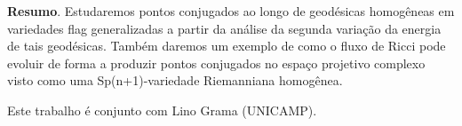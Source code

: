 	\vspace{24pt}

	
	
	\noindent\textbf{Resumo}.\label{rp} 
	Estudaremos pontos conjugados ao longo de geodésicas homogêneas em variedades flag generalizadas a partir da análise da segunda variação da energia de tais geodésicas. Também daremos um exemplo de como o fluxo de Ricci pode evoluir de forma a produzir pontos conjugados no espaço projetivo complexo visto como uma Sp(n+1)-variedade Riemanniana homogênea.
	
	\vspace*{0.5cm} \noindent Este trabalho é conjunto com Lino Grama (UNICAMP).
	\vspace{24pt}

%	
%	
%	

%	
%	
%	

%	
%	
%	

%	
%	
%	



\clearpage	